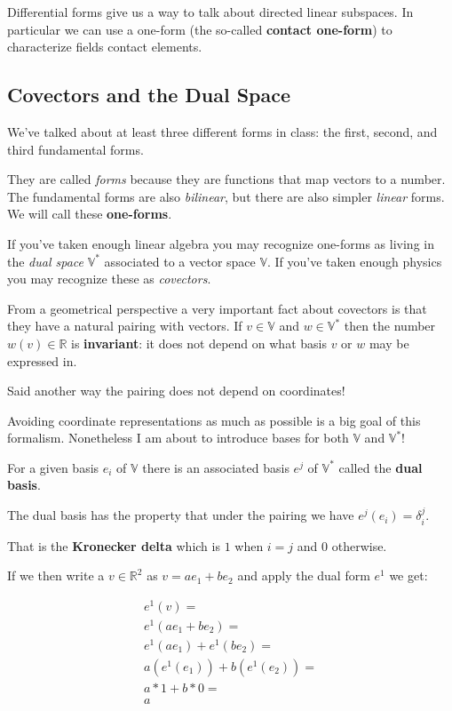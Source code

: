 \documentclass{article}
\begin{document}
Differential forms give us a way to talk about directed linear subspaces. In
particular we can use a one-form (the so-called \textbf{contact one-form}) to
characterize fields contact elements.

\subsection{Covectors and the Dual Space}
We've talked about at least three different forms in class: the first, second,
and third fundamental forms.

They are called \textit{forms} because they are functions that map vectors to a
number. The fundamental forms are also \textit{bilinear}, but there are also simpler
\textit{linear} forms. We will call these \textbf{one-forms}.

If you've taken enough linear algebra you may recognize one-forms as living in
the \textit{dual space} $\mathbb{V}^{*}$ associated to a vector space
$\mathbb{V}$. If you've taken enough physics you may recognize these as \textit{covectors}.

From a geometrical perspective a very important fact about covectors is that
they have a natural pairing with vectors. If $v \in \mathbb{V}$ and $w \in \mathbb{V}^{*}$ then the number $w(v) \in
\mathbb{R}$ is \textbf{invariant}: it does not depend on what basis $v$ or $w$
may be expressed in.

Said another way the pairing does not depend on coordinates!

Avoiding coordinate representations as much as possible is a big goal of this
formalism. Nonetheless I am about to introduce bases for both $\mathbb{V}$ and $\mathbb{V}^{*}$!

For a given basis $e_{i}$ of $\mathbb{V}$ there is an associated basis $e^{j}$
of $\mathbb{V}^{*}$ called the \textbf{dual basis}.

The dual basis has the property that under the pairing we have $e^{j}(e_{i}) = \delta^{j}_{i}$.

That is the \textbf{Kronecker delta} which is $1$ when $i = j$ and $0$
otherwise.

If we then write a $v \in \mathbb{R}^{2}$ as $v = ae_{1} + be_{2}$ and apply the
dual form $e^{1}$ we get:

\begin{align*}
  e^{1} (v) = \\
  e^{1}(ae_{1} + be_{2}) = \\
  e^{1}(ae_{1}) + e^{1}(be_{2}) = \\
  a(e^{1}(e_{1})) + b(e^{1}(e_{2})) = \\
  a * 1 + b * 0 = \\
  a
\end{align*}
\end{document}
